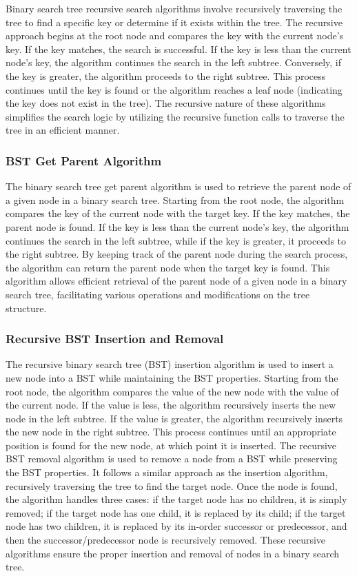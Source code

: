 Binary search tree recursive search algorithms involve recursively traversing the tree to find a specific key or determine if it exists within the tree. The recursive approach begins at the root node and compares the key with the current node's key. If the key matches, the search is successful. If the key is less than the current node's key, 
the algorithm continues the search in the left subtree. Conversely, if the key is greater, the algorithm proceeds to the right subtree. This process continues until the key is found or the algorithm reaches a leaf node (indicating the key does not exist in the tree). The recursive nature of these algorithms simplifies the search logic by utilizing 
the recursive function calls to traverse the tree in an efficient manner.

\subsubsection{BST Get Parent Algorithm}

The binary search tree get parent algorithm is used to retrieve the parent node of a given node in a binary search tree. Starting from the root node, the algorithm compares the key of the current node with the target key. If the key matches, the parent node is found. If the key is less than the current node's key, the algorithm continues 
the search in the left subtree, while if the key is greater, it proceeds to the right subtree. By keeping track of the parent node during the search process, the algorithm can return the parent node when the target key is found. This algorithm allows efficient retrieval of the parent node of a given node in a binary search tree, facilitating 
various operations and modifications on the tree structure.

\subsubsection{Recursive BST Insertion and Removal}

The recursive binary search tree (BST) insertion algorithm is used to insert a new node into a BST while maintaining the BST properties. Starting from the root node, the algorithm compares the value of the new node with the value of the current node. If the value is less, the algorithm recursively inserts the new node in the left subtree. 
If the value is greater, the algorithm recursively inserts the new node in the right subtree. This process continues until an appropriate position is found for the new node, at which point it is inserted. The recursive BST removal algorithm is used to remove a node from a BST while preserving the BST properties. It follows a similar approach 
as the insertion algorithm, recursively traversing the tree to find the target node. Once the node is found, the algorithm handles three cases: if the target node has no children, it is simply removed; if the target node has one child, it is replaced by its child; if the target node has two children, it is replaced by its in-order successor 
or predecessor, and then the successor/predecessor node is recursively removed. These recursive algorithms ensure the proper insertion and removal of nodes in a binary search tree.

